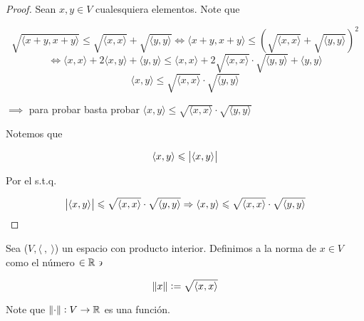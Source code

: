 \begin{proof}
    Sean $x, y \in V$ cualesquiera elementos. Note que

    \begin{equation*}
         \sqrt{\langle x + y, x + y \rangle} \leqslant \sqrt{\langle x,x \rangle} + \sqrt{\langle y,y \rangle} \Leftrightarrow \langle x + y, x + y \rangle \leqslant {(\sqrt{\langle x,x \rangle} + \sqrt{\langle y,y \rangle})}^{2}
    \end{equation*}
    \begin{equation*}
        \Leftrightarrow \langle x , x \rangle + 2 \langle x ,y \rangle + \langle y , y \rangle \leqslant \langle x , x \rangle + 2 \sqrt{\langle x,x \rangle} \cdot \sqrt{\langle y,y \rangle} + \langle y , y \rangle 
    \end{equation*}
    \begin{equation*}
        \langle x,y \rangle \leqslant \sqrt{\langle x,x \rangle} \cdot \sqrt{\langle y,y \rangle}
    \end{equation*}

    $\implies$ para probar  basta probar $\langle x,y \rangle \leqslant \sqrt{\langle x,x \rangle} \cdot \sqrt{\langle y,y \rangle}$

    Notemos que

    \begin{equation*}
        \langle x,y \rangle \leqslant \abs{\langle x,y \rangle}
    \end{equation*}

    Por el  s.t.q.

    \begin{equation*}
        \abs{\langle x,y \rangle} \leqslant \sqrt{\langle x,x \rangle} \cdot \sqrt{\langle y,y \rangle} \Rightarrow \langle x,y \rangle \leqslant \sqrt{\langle x,x \rangle} \cdot \sqrt{\langle y,y \rangle}
    \end{equation*}
\end{proof}

\begin{definition} \label{def14}
    Sea ($V, \langle \: , \: \rangle$) un espacio con producto interior. Definimos a la norma de $x \in V$ como el número $\in \mathbb{R} \backepsilon$

    \begin{equation*}
        \norm{x} := \sqrt{\langle x,x \rangle}
    \end{equation*}

    Note que $\norm{\cdot} : V \to \mathbb{R}$ es una función.
\end{definition}

